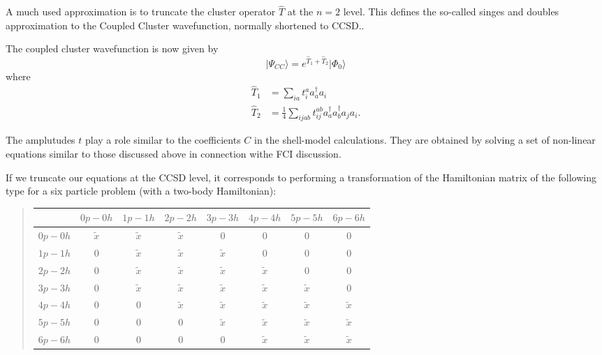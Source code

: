\documentclass[%
oneside,                 %
final,                   %
10pt]{article}
\begin{document}
A much used approximation is to  truncate the cluster operator $\hat{T}$ at the $n=2$ level. This defines the so-called singes and doubles approximation to the Coupled Cluster wavefunction, normally shortened to CCSD..

The coupled cluster wavefunction is now given by
\begin{equation*}
            \vert \Psi_{CC}\rangle = e^{\hat{T}_1 + \hat{T}_2} \vert \Phi_0\rangle
\end{equation*}
where 
        \begin{align*}
            \hat{T}_1 &= 
            \sum_{ia}
                t_{i}^{a} a_{a}^\dagger a_i \\
            \hat{T}_2 &= \frac{1}{4} 
            \sum_{ijab}
                t_{ij}^{ab} a_{a}^\dagger a_{b}^\dagger a_{j} a_{i}.
        \end{align*}

The amplutudes $t$ play a role similar to the coefficients $C$ in the shell-model calculations. They are obtained by solving a set of non-linear equations
similar to those discussed above in connection withe FCI discussion.

If we truncate our equations at the CCSD level, it corresponds to performing a transformation of the Hamiltonian matrix of the following type for a six particle problem (with a two-body Hamiltonian):


\begin{quote}
\begin{tabular}{cccccccc}
\hline
\multicolumn{1}{c}{  } & \multicolumn{1}{c}{ $0p-0h$ } & \multicolumn{1}{c}{ $1p-1h$ } & \multicolumn{1}{c}{ $2p-2h$ } & \multicolumn{1}{c}{ $3p-3h$ } & \multicolumn{1}{c}{ $4p-4h$ } & \multicolumn{1}{c}{ $5p-5h$ } & \multicolumn{1}{c}{ $6p-6h$ } \\
\hline
$0p-0h$ & $\tilde{x}$ & $\tilde{x}$ & $\tilde{x}$ & 0           & 0           & 0           & 0           \\
$1p-1h$ & 0           & $\tilde{x}$ & $\tilde{x}$ & $\tilde{x}$ & 0           & 0           & 0           \\
$2p-2h$ & 0           & $\tilde{x}$ & $\tilde{x}$ & $\tilde{x}$ & $\tilde{x}$ & 0           & 0           \\
$3p-3h$ & 0           & $\tilde{x}$ & $\tilde{x}$ & $\tilde{x}$ & $\tilde{x}$ & $\tilde{x}$ & 0           \\
$4p-4h$ & 0           & 0           & $\tilde{x}$ & $\tilde{x}$ & $\tilde{x}$ & $\tilde{x}$ & $\tilde{x}$ \\
$5p-5h$ & 0           & 0           & 0           & $\tilde{x}$ & $\tilde{x}$ & $\tilde{x}$ & $\tilde{x}$ \\
$6p-6h$ & 0           & 0           & 0           & 0           & $\tilde{x}$ & $\tilde{x}$ & $\tilde{x}$ \\
\hline
\end{tabular}
\end{quote}
\end{document}
